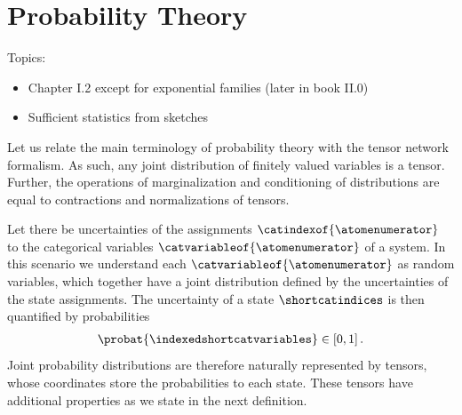 \chapter{Probability Theory}


Topics:
\begin{itemize}
    \item Chapter I.2 except for exponential families (later in book II.0)
    \item Sufficient statistics from sketches
\end{itemize}



Let us relate the main terminology of probability theory with the tensor network formalism.
As such, any joint distribution of finitely valued variables is a tensor.
Further, the operations of marginalization and conditioning of distributions are equal to contractions and normalizations of tensors.


Let there be uncertainties of the assignments $\catindexof{\atomenumerator}$ to the categorical variables $\catvariableof{\atomenumerator}$ of a system.
In this scenario we understand each $\catvariableof{\atomenumerator}$ as random variables, which together have a joint distribution defined by the uncertainties of the state assignments.
The uncertainty of a state $\shortcatindices$ is then quantified by probabilities
\begin{align*}
    \probat{\indexedshortcatvariables} \in [0,1] \, .
\end{align*}
Joint probability distributions are therefore naturally represented by tensors, whose coordinates store the probabilities to each state.
These tensors have additional properties as we state in the next definition.

